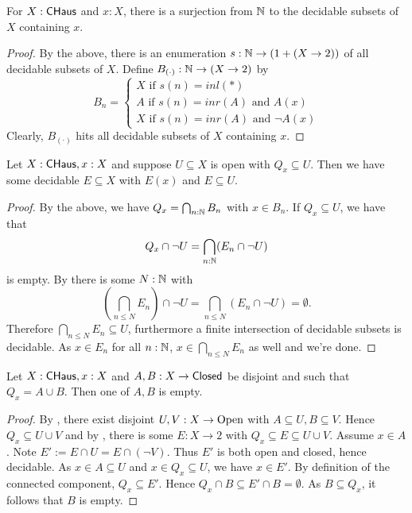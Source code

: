 \begin{corollary}
  For $X:\mathsf{CHaus}$ and $x:X$, there is a surjection from $\mathbb{N}$ to the decidable subsets of $X$ containing $x$. 
\end{corollary}
\begin{proof}
  By the above, %
  there is an enumeration $s: \mathbb{N} \to (1 + (X \to 2))$ of all decidable subsets of $X$. 
  Define $B_{(\cdot)}:\mathbb{N} \to (X \to 2)$ by 
  $$B_n = \begin{cases}
    X \text { if } s(n) = inl(*) \\
    A \text { if } s(n) = inr(A) \text { and } A(x) \\
    X \text { if } s(n) = inr(A) \text { and } \neg A(x)
  \end{cases}
  $$
  Clearly, $B_{(\cdot)}$ hits all decidable subsets of $X$ containing $x$. 
\end{proof}

\begin{lemma}\label{ConnectedComponentSubOpenHasDecidableInbetween}
  Let $X:\mathsf{CHaus}, x:X$ and suppose $U\subseteq X$ is open with $Q_x\subseteq U$. 
  Then we have some decidable $E\subseteq X$ with $E(x)$ and $E\subseteq U$. 
\end{lemma}
\begin{proof}
  By the above, we have $Q_x = \bigcap_{n:\mathbb{N}}B_n$ with $x\in B_n$. 
  If $Q_x \subseteq U$, we have that 
  $$Q_x\cap \neg U = \bigcap_{n:\mathbb{N}} (E_n \cap \neg U)$$ is empty. 
  By  there is some $N:\mathbb{N}$ with 
  $$(\bigcap_{n\leq N} E_n )\cap \neg U  = \bigcap_{n\leq N} (E_n \cap \neg U) = \emptyset.$$
  Therefore $\bigcap_{n\leq N} E_n \subseteq U$, furthermore a finite intersection of decidable subsets is decidable. 
  As $x\in E_n$ for all $n:\mathbb{N}$, $x\in \bigcap_{n\leq N} E_n$ as well and we're done. 
\end{proof}

\begin{lemma}
Let $X:\mathsf{CHaus}, x:X$ and $A,B:X \to \mathsf{Closed}$ be disjoint and such that $Q_x = A \cup B$. 
Then one of $A,B$ is empty. 
\end{lemma} 
\begin{proof}
  By , there exist disjoint $U,V:X\to \mathrm{Open}$ with 
  $A\subseteq U, B\subseteq V$. 
  Hence  $Q_x \subseteq U\cup V$ and by , 
  there is some $E:X \to 2$ with $Q_x \subseteq E\subseteq U \cup V$. 
  Assume $x\in A$.
  Note $E' := E \cap U = E \cap ( \neg V)$. Thus $E'$ is both open and closed, hence decidable. 
  As $x\in A\subseteq U$ and $x\in Q_x \subseteq U$, we have $x\in E'$. 
  By definition of the connected component, $Q_x \subseteq E'$. 
  Hence $Q_x \cap B \subseteq  E' \cap B  = \emptyset$. 
  As $B\subseteq Q_x$, it follows that $B$ is empty. 
\end{proof}

